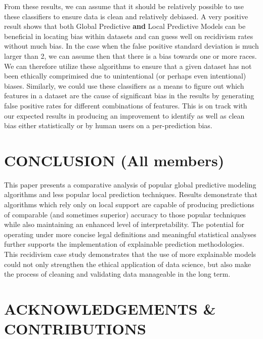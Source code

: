 \documentclass[sigconf]{acmart}
\begin{document}
From these results, we can assume that it should be relatively possible to use these classifiers to ensure data is clean and relatively debiased. A very positive result shows that both Global Predictive \textbf{and} Local Predictive Models can be beneficial in locating bias within datasets and can guess well on recidivism rates without much bias. In the case when the false positive standard deviation is much larger than 2, we can assume then that there is a bias towards one or more races. We can therefore utilize these algorithms to ensure that a given dataset has not been ethically comprimised due to unintentional (or perhaps even intentional) biases. Similarly, we could use these classifiers as a means to figure out which features in a dataset are the cause of significant bias in the results by generating false positive rates for different combinations of features. This is on track with our expected results in producing an improvement to identify as well as clean bias either statistically or by human users on a per-prediction bias.


\section{CONCLUSION (All members)}
\label{sec:conclusion}

This paper presents a comparative analysis of popular global predictive modeling algorithms and less popular local prediction techniques. Results demonstrate that algorithms which rely only on local support are capable of producing predictions of comparable (and sometimes superior) accuracy to those popular techniques while also maintaining an enhanced level of interpretability. The potential for operating under more concise legal definitions and meaningful statistical analyses further supports the implementation of explainable prediction methodologies. This recidivism case study demonstrates that the use of more explainable models could not only strengthen the ethical application of data science, but also make the process of cleaning and validating data manageable in the long term.



\section{ACKNOWLEDGEMENTS \& CONTRIBUTIONS}
\end{document}
